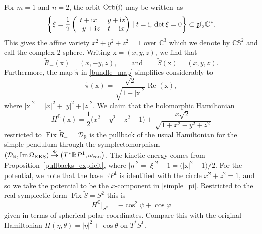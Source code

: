 \documentclass[pdftex]{sigma}
\numberwithin{equation}{section}
\DeclareMathOperator{\fix}{Fix}
\DeclareMathOperator{\Imag}{Im}
\DeclareMathOperator{\Real}{Re}
\newcommand{\R}{\mathbb{R}}
\newcommand{\C}{\mathbb{C}}
\newcommand{\D}{\mathcal{D}}
\newcommand{\CS}{\mathbb{CS}}
\newcommand{\RP}{\mathbb{R}P}
\begin{document}
\begin{Example}
		For $m=1$ and $n=2$, the orbit ${\rm Orb}({\rm i})$ may be written~as%
		\begin{equation}\label{2by2}
			\biggl\{\xi=\frac{1}{2}\begin{pmatrix}
				t+{\rm i}x & y+{\rm i}z \\ -y+{\rm i}z & t-{\rm i}x
			\end{pmatrix} \mid t={\rm i},\,\det\xi=0\biggr\}\subset\mathfrak{gl}_2\C^*.
		\end{equation}
		This gives the affine variety $x^2+y^2+z^2=1$ over $\C^3$ which we denote by $\CS^2$ and call the complex 2-sphere. Writing $\text{x}=(x,y,z)$, we find that
		\begin{equation}\label{R_twiddle}
\widetilde{R}_-(\text{x})=(\overline{x},-\overline{y},\overline{z}),\qquad\text{and}\qquad\widetilde{S}(\text{x})=(\overline{x},\overline{y},\overline{z}).
		\end{equation}
		Furthermore, the map $\widetilde{\pi}$ in \eqref{bundle_map} simplifies considerably to
		\begin{equation}\label{simple_pi}
			\widetilde{\pi}(\text{x})=\frac{\sqrt{2}}{\sqrt{1+|\text{x}|^2}}\Real(\text{x}),
		\end{equation}
		where $|\text{x}|^2=|x|^2+|y|^2+|z|^2$. We claim that the holomorphic Hamiltonian
		\begin{equation*}
			H^\C(\text{x})=\frac{1}{2}\bigl(x^2-y^2+z^2-1\bigr)+\frac{x\sqrt{2}}{\sqrt{1+x^2-y^2+z^2}}
		\end{equation*}
		restricted to $\fix\widetilde{R}_-=\D_\R$ is the pullback of the usual Hamiltonian for the simple pendulum through the symplectomorphism $(\D_\R,\Imag\Omega_{\rm KKS})\overset{\Phi}{\rightarrow}\bigl(T^*\RP^1,\omega_\text{can}\bigr)$. The kinetic energy comes from Proposition~\ref{pullbacks_explicit}, where $|\eta|^2=|\xi|^2-1=\bigl(|\text{x}|^2-1\bigr)/2$. For the potential, we note that the base $\RP^1$ is identified with the circle $x^2+z^2=1$, and so we take the potential to be the $x$-component in \eqref{simple_pi}. Restricted to the real-symplectic form $\fix\widetilde{S}=S^2$ this is
		\begin{equation*}
			H^\C\big|_{S^2}=-\cos^2\psi+\cos\varphi
		\end{equation*}
		given in terms of spherical polar coordinates. Compare this with the original Hamiltonian $H(
		\eta,\theta)=|\eta|^2+\cos\theta$ on $T^*S^1$.
	\end{Example}
	
\end{document}
